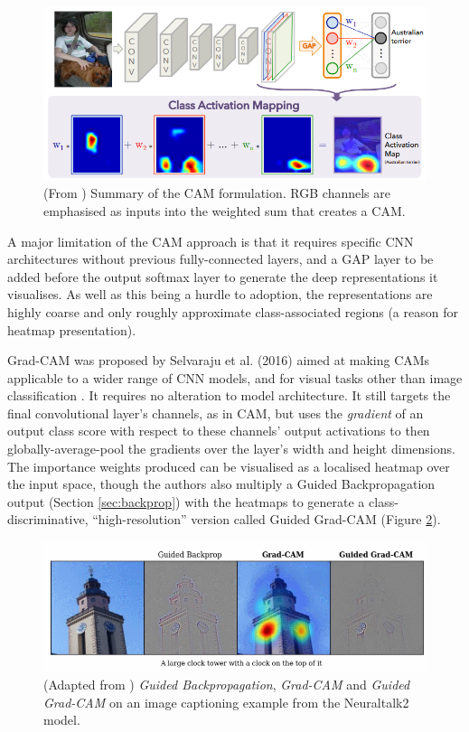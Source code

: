 \documentclass[main]{subfiles}
\begin{document}
\begin{figure}[h]
\centering
\includegraphics[scale=0.5]{cam.png}
\caption{(From \cite{cam}) Summary of the CAM formulation. RGB channels are emphasised as inputs into the weighted sum that creates a CAM.}
\label{camimg}
\end{figure}

A major limitation of the CAM approach is that it requires specific CNN architectures without previous fully-connected layers, and a GAP layer to be added before the output softmax layer to generate the deep representations it visualises. As well as this being a hurdle to adoption, the representations are highly coarse and only roughly approximate class-associated regions (a reason for heatmap presentation).

Grad-CAM was proposed by Selvaraju et al. (2016) aimed at making CAMs applicable to a wider range of CNN models, and for visual tasks other than image classification \cite{gradcam}. It requires no alteration to model architecture. It still targets the final convolutional layer's channels, as in CAM, but uses the \textit{gradient} of an output class score with respect to these channels' output activations to then globally-average-pool the gradients over the layer's width and height dimensions. The importance weights produced can be visualised as a localised heatmap over the input space, though the authors also multiply a Guided Backpropagation output (Section \ref{sec:backprop}) with the heatmaps to generate a class-discriminative, ``high-resolution'' version called Guided Grad-CAM (Figure \ref{gradimg}).

\begin{figure}[h]
\centering
\includegraphics[scale=0.6]{gradcam_I.png}
\caption{(Adapted from \cite{gradcam}) \textit{Guided Backpropagation}, \textit{Grad-CAM} and \textit{Guided Grad-CAM} on an image captioning example from the Neuraltalk2 model.}
\label{gradimg}
\end{figure}
\end{document}
